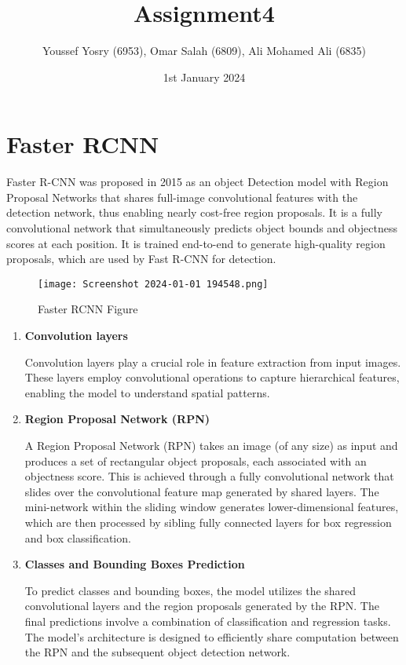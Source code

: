 \documentclass{article}
\title{Assignment4}
\author{Youssef Yosry (6953), Omar Salah (6809), Ali Mohamed Ali (6835)}
\date{1st January 2024}
\begin{document}
\maketitle

\section{Faster RCNN}

Faster R-CNN was proposed in 2015 as an object Detection model with Region Proposal Networks that shares full-image convolutional features with the detection network, thus enabling nearly cost-free region proposals. It is a fully convolutional network that simultaneously predicts object bounds and objectness scores at each position. It is trained end-to-end to generate high-quality region proposals, which are used by Fast R-CNN for detection. \cite{ren2016faster}


\begin{figure}[H]
  \centering
  \texttt{[image: Screenshot 2024-01-01 194548.png]} %
  \caption{Faster RCNN Figure}
  \label{fig:example}
\end{figure}


\begin{enumerate}
    \item \textbf{Convolution layers}
    
    Convolution layers play a crucial role in feature extraction from input images. These layers employ convolutional operations to capture hierarchical features, enabling the model to understand spatial patterns.
    
    \item \textbf{Region Proposal Network (RPN)}
    
    A Region Proposal Network (RPN) takes an image (of any size) as input and produces a set of rectangular object proposals, each associated with an objectness score. This is achieved through a fully convolutional network that slides over the convolutional feature map generated by shared layers. The mini-network within the sliding window generates lower-dimensional features, which are then processed by sibling fully connected layers for box regression and box classification.
    
    \item \textbf{Classes and Bounding Boxes Prediction}
    
    To predict classes and bounding boxes, the model utilizes the shared convolutional layers and the region proposals generated by the RPN. The final predictions involve a combination of classification and regression tasks. The model's architecture is designed to efficiently share computation between the RPN and the subsequent object detection network.
\end{enumerate}
\end{document}
